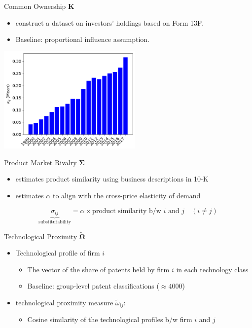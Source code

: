\documentclass[
  10pt, %
  aspectratio=169,  %
  handout
]{beamer}
\theoremstyle{plain}
\begin{document}
\begin{frame}{Common Ownership $\boldsymbol{K}$}
  \begin{itemize}
    \item \citet{Backus2021-yt} construct a dataset on investors' holdings
          based on Form 13F.
    \item Baseline: \citet{Rotemberg1984-jz} proportional influence assumption. \hfill\hyperlink{rotemberg}{}
  \end{itemize}
  \begin{center}
    \includegraphics[width=7cm]{figures/kappa}
  \end{center}
\end{frame}
%
\begin{frame}{Product Market Rivalry $\boldsymbol{\Sigma}$} 

  \begin{itemize}
    \item \label{product_identification} \citet{Hoberg2016-jm} estimates product similarity using business
          descriptions in 10-K
          \medskip{}
    \item \citet{Pellegrino2024-dn} estimates $\alpha$ to align with the cross-price
          elasticity of demand \hyperlink{micro_vs_ghl}{}
  \end{itemize}
  \medskip{}
  \[
    \underbrace{\sigma_{ij}}_{\text{substitutability}}=\alpha\times\text{product similarity b/w }i\text{ and }j\quad\left(i\neq j\right)
  \]

\end{frame}
%
\begin{frame}{Technological Proximity $\widetilde{\boldsymbol{\Omega}}$}
  \begin{itemize}
    \item Technological profile of firm $i$
          \begin{itemize}
            \item The vector of the share of patents held by firm
            $i$ in each technology class
            \item Baseline: group-level patent classifications ($\approx4000$)\medskip{}
          \end{itemize}
          \medskip{}
    \item \citet{Jaffe1986-yz} technological proximity measure $\tilde{\omega}_{ij}$:
      \begin{itemize}
      \item Cosine similarity of the technological profiles b/w firm $i$ and $j$
      \end{itemize}
  \end{itemize}
\end{frame}
\end{document}
